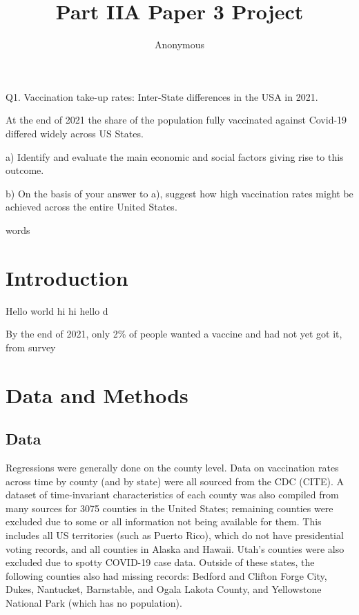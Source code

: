 \documentclass[12pt]{article}
\title{Part IIA Paper 3 Project}
\author{
	Anonymous
}
\newcommand\wordcount{
	\immediate\write18{texcount -sum -1 \jobname.tex > count.txt} 
	
}
\begin{document}
	\maketitle
	\begin{spacing}{1.5} %
		Q1. Vaccination take-up rates: Inter-State differences in the USA in 2021.
		
		At the end of 2021 the share of the population fully vaccinated against Covid-19 differed widely across US States.
		
		a) Identify and evaluate the main economic and social factors giving rise to this outcome.
		
		b) On the basis of your answer to a), suggest how high vaccination rates might be achieved across the entire United States.
		
		\wordcount words
		\section{Introduction}
		Hello world hi hi hello d
		
		By the end of 2021, only 2\% of people wanted a vaccine and had not yet got it, from survey
		
		\section{Data and Methods}
		\subsection{Data}
		Regressions were generally done on the county level. Data on vaccination rates across time by county (and by state) were all sourced from the CDC (CITE). A dataset of time-invariant characteristics of each county was also compiled from many sources for 3075 counties in the United States; remaining counties were excluded due to some or all information not being available for them. This includes all US territories (such as Puerto Rico), which do not have presidential voting records, and all counties in Alaska and Hawaii. Utah's counties were also excluded due to spotty COVID-19 case data. Outside of these states, the following counties also had missing records: Bedford and Clifton Forge City, Dukes, Nantucket, Barnstable, and Ogala Lakota County, and Yellowstone National Park (which has no population).
		

\end{spacing}
\end{document}
